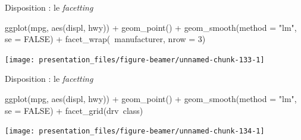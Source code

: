 \documentclass[12pt,handout,ignorenonframetext,]{beamer}
\newenvironment{Shaded}{}{}
\newcommand{\KeywordTok}[1]{\textcolor[rgb]{0.00,0.00,1.00}{{#1}}}
\newcommand{\DataTypeTok}[1]{{#1}}
\newcommand{\DecValTok}[1]{{#1}}
\newcommand{\StringTok}[1]{\textcolor[rgb]{0.00,0.50,0.50}{{#1}}}
\newcommand{\OtherTok}[1]{\textcolor[rgb]{1.00,0.25,0.00}{{#1}}}
\newcommand{\NormalTok}[1]{{#1}}
\renewenvironment{Shaded}{\begin{snugshade}}{\end{snugshade}}
\begin{document}
\begin{frame}[fragile]{Disposition : le \emph{facetting}}

\footnotesize \center

\begin{Shaded}
\begin{Highlighting}[]
\KeywordTok{ggplot}\NormalTok{(mpg, }\KeywordTok{aes}\NormalTok{(displ, hwy)) +}
\StringTok{  }\KeywordTok{geom_point}\NormalTok{() +}\StringTok{ }\KeywordTok{geom_smooth}\NormalTok{(}\DataTypeTok{method =} \StringTok{"lm"}\NormalTok{, }\DataTypeTok{se =} \OtherTok{FALSE}\NormalTok{) +}\StringTok{ }
\StringTok{  }\KeywordTok{facet_wrap}\NormalTok{(~manufacturer, }\DataTypeTok{nrow =} \DecValTok{3}\NormalTok{)}
\end{Highlighting}
\end{Shaded}

\texttt{[image: presentation\_files/figure-beamer/unnamed-chunk-133-1]}

\end{frame}

\begin{frame}[fragile]{Disposition : le \emph{facetting}}

\footnotesize \center

\begin{Shaded}
\begin{Highlighting}[]
\KeywordTok{ggplot}\NormalTok{(mpg, }\KeywordTok{aes}\NormalTok{(displ, hwy)) +}
\StringTok{  }\KeywordTok{geom_point}\NormalTok{() +}\StringTok{ }\KeywordTok{geom_smooth}\NormalTok{(}\DataTypeTok{method =} \StringTok{"lm"}\NormalTok{, }\DataTypeTok{se =} \OtherTok{FALSE}\NormalTok{) +}\StringTok{ }
\StringTok{  }\KeywordTok{facet_grid}\NormalTok{(drv~class)}
\end{Highlighting}
\end{Shaded}

\texttt{[image: presentation\_files/figure-beamer/unnamed-chunk-134-1]}

\end{frame}
\end{document}
